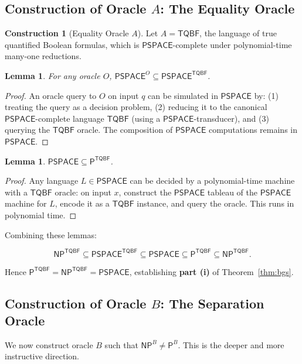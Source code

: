 \documentclass[11pt,a4paper]{article}
\theoremstyle{plain}
\newtheorem{lemma}[theorem]{Lemma}
\theoremstyle{definition}
\newtheorem{construction}[theorem]{Construction}
\theoremstyle{remark}
\newcommand{\PP}{\mathsf{P}}
\newcommand{\NP}{\mathsf{NP}}
\newcommand{\PSPACE}{\mathsf{PSPACE}}
\newcommand{\TQBF}{\mathsf{TQBF}}
\begin{document}
\subsection{Construction of Oracle $A$: The Equality Oracle}

\begin{construction}[Equality Oracle $A$]\label{cons:eq_oracle}
Let $A = \TQBF$, the language of true quantified Boolean formulas, which is
$\PSPACE$-complete under polynomial-time many-one reductions.

\begin{lemma}\label{lem:pspace_oracle}
For any oracle $O$, $\PSPACE^O \subseteq \PSPACE^{\TQBF}$.
\end{lemma}
\begin{proof}
An oracle query to $O$ on input $q$ can be simulated in $\PSPACE$ by:
(1) treating the query as a decision problem, (2) reducing it to the canonical
$\PSPACE$-complete language $\TQBF$ (using a $\PSPACE$-transducer), and
(3) querying the $\TQBF$ oracle.  The composition of $\PSPACE$ computations
remains in $\PSPACE$.
\end{proof}

\begin{lemma}\label{lem:pspace_in_ptqbf}
$\PSPACE \subseteq \PP^{\TQBF}$.
\end{lemma}
\begin{proof}
Any language $L \in \PSPACE$ can be decided by a polynomial-time machine with
a $\TQBF$ oracle: on input $x$, construct the $\PSPACE$ tableau of the
$\PSPACE$ machine for $L$, encode it as a $\TQBF$ instance, and query the
oracle.  This runs in polynomial time.
\end{proof}

Combining these lemmas:

\[
\NP^{\TQBF} \subseteq \PSPACE^{\TQBF} \subseteq \PSPACE \subseteq \PP^{\TQBF}
\subseteq \NP^{\TQBF}.
\]

Hence $\PP^{\TQBF} = \NP^{\TQBF} = \PSPACE$, establishing \textbf{part (i)} of
Theorem~\ref{thm:bgs}.
\end{construction}

\subsection{Construction of Oracle $B$: The Separation Oracle}

We now construct oracle $B$ such that $\NP^B \neq \PP^B$.  This is the deeper
and more instructive direction.
\end{document}

